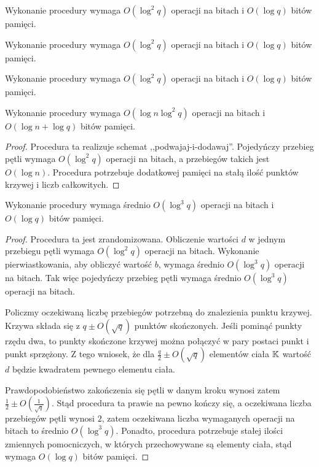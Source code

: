 \begin{fact}
Wykonanie procedury 
wymaga \linebreak $O(\log^2 q)$ operacji na bitach i $O(\log q)$ bitów pamięci.
\end{fact}

\begin{fact}
Wykonanie procedury 
wymaga $O(\log^2 q)$ operacji na bitach i $O(\log q)$ bitów pamięci.
\end{fact}

\begin{fact}
Wykonanie procedury 
wymaga $O(\log^2 q)$ operacji na bitach i $O(\log q)$ bitów pamięci.
\end{fact}

\begin{lemma}
Wykonanie procedury 
wymaga \linebreak $O(\log n \log^2 q)$ operacji na bitach
i $O(\log n + \log q)$ bitów pamięci.
\end{lemma}

\begin{proof}
Procedura ta realizuje schemat ,,podwajaj-i-dodawaj''.
Pojedyńczy przebieg pętli  wymaga
$O(\log^2 q)$ operacji na bitach,
a przebiegów takich jest $O(\log n)$.
Procedura potrzebuje dodatkowej pamięci na stałą ilość
punktów krzywej i liczb całkowitych.
\end{proof}

\begin{lemma}
Wykonanie procedury 
wymaga średnio \linebreak
$O(\log^3 q)$ operacji na bitach i $O(\log q)$ bitów pamięci.
\end{lemma}

\begin{proof}
Procedura ta jest zrandomizowana.
Obliczenie wartości $d$ w jednym przebiegu pętli
wymaga $O(\log^2 q)$ operacji na bitach.
Wykonanie pierwiastkowania, aby obliczyć wartość $b$,
wymaga średnio $O(\log^3 q)$ operacji na bitach.
Tak więc pojedyńczy przebieg pętli 
wymaga średnio $O(\log^3 q)$ operacji na bitach.

\noindent
Policzmy oczekiwaną liczbę przebiegów potrzebną do znalezienia punktu krzywej.
Krzywa składa się z $q \pm O(\sqrt{q})$ punktów skończonych.
Jeśli pominąć punkty rzędu dwa,
to punkty skończone krzywej można połączyć w pary postaci
punkt i punkt sprzężony.
Z tego wniosek, że dla $\frac{q}{2} \pm O(\sqrt{q})$ elementów ciała $\mathbb{K}$
wartość $d$ będzie kwadratem pewnego elementu ciała.

\noindent
Prawdopodobieństwo zakończenia się pętli w danym kroku
wynosi zatem $\frac{1}{2} \pm O(\frac{1}{\sqrt{q}})$.
Stąd procedura ta prawie na pewno kończy się,
a oczekiwana liczba przebiegów pętli  wynosi $2$,
zatem oczekiwana liczba wymaganych operacji na bitach
to średnio $O(\log^3 q)$.
Ponadto, procedura potrzebuje stałej ilości zmiennych pomocniczych,
w których przechowywane są elementy ciała,
stąd wymaga $O(\log q)$ bitów pamięci.
\end{proof}

